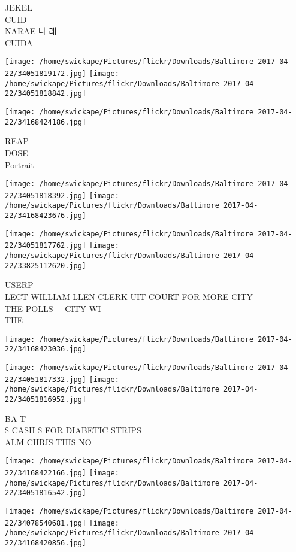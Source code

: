 \documentclass[10pt,letterpaper]{article}
\begin{document}
JEKEL\\
CUID\\
NARAE 나 래\\
CUIDA
\pagebreak

\texttt{[image: /home/swickape/Pictures/flickr/Downloads/Baltimore 2017-04-22/34051819172.jpg]}
\texttt{[image: /home/swickape/Pictures/flickr/Downloads/Baltimore 2017-04-22/34051818842.jpg]}

\vspace{0.25in}
\texttt{[image: /home/swickape/Pictures/flickr/Downloads/Baltimore 2017-04-22/34168424186.jpg]}

REAP\\
DOSE\\
Portrait
\pagebreak

\texttt{[image: /home/swickape/Pictures/flickr/Downloads/Baltimore 2017-04-22/34051818392.jpg]}
\texttt{[image: /home/swickape/Pictures/flickr/Downloads/Baltimore 2017-04-22/34168423676.jpg]}

\texttt{[image: /home/swickape/Pictures/flickr/Downloads/Baltimore 2017-04-22/34051817762.jpg]}
\texttt{[image: /home/swickape/Pictures/flickr/Downloads/Baltimore 2017-04-22/33825112620.jpg]}

USERP\\
LECT WILLIAM LLEN CLERK UIT COURT FOR MORE CITY\\
THE POLLS \_ CITY WI\\
THE
\pagebreak

\texttt{[image: /home/swickape/Pictures/flickr/Downloads/Baltimore 2017-04-22/34168423036.jpg]}

\vspace{0.25in}
\texttt{[image: /home/swickape/Pictures/flickr/Downloads/Baltimore 2017-04-22/34051817332.jpg]}
\texttt{[image: /home/swickape/Pictures/flickr/Downloads/Baltimore 2017-04-22/34051816952.jpg]}

BA T\\
\$ CASH \$ FOR DIABETIC STRIPS\\
ALM CHRIS THIS NO
\pagebreak

\texttt{[image: /home/swickape/Pictures/flickr/Downloads/Baltimore 2017-04-22/34168422166.jpg]}
\texttt{[image: /home/swickape/Pictures/flickr/Downloads/Baltimore 2017-04-22/34051816542.jpg]}

\texttt{[image: /home/swickape/Pictures/flickr/Downloads/Baltimore 2017-04-22/34078540681.jpg]}
\texttt{[image: /home/swickape/Pictures/flickr/Downloads/Baltimore 2017-04-22/34168420856.jpg]}
\end{document}
